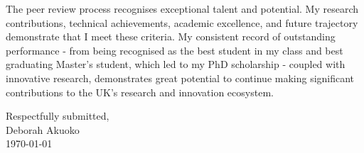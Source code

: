 \documentclass[12pt,a4paper]{article}
\begin{document}
The peer review process recognises exceptional talent and potential. My research contributions, technical achievements, academic excellence, and future trajectory demonstrate that I meet these criteria. My consistent record of outstanding performance - from being recognised as the best student in my class and best graduating Master's student, which led to my PhD scholarship - coupled with innovative research, demonstrates great potential to continue making significant contributions to the UK's research and innovation ecosystem.

\vspace{1cm}

\noindent
Respectfully submitted,\\
\vspace{0.5cm}
\noindent
Deborah Akuoko\\
\today
\end{document}
